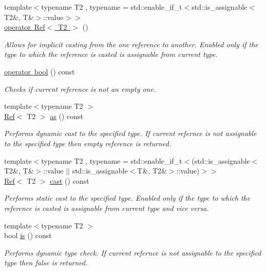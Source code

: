 \begin{DoxyCompactItemize}
{\footnotesize template$<$typename T2 , typename  = std\+::enable\+\_\+if\+\_\+t$<$std\+::is\+\_\+assignable$<$\+T2\&, T\&$>$\+::value$>$$>$ }\\\mbox{\hyperlink{class_ref_a092daaa0d297f615642fc4870cff4f47}{operator Ref$<$ T2 $>$}} ()
\begin{DoxyCompactList}\small\item\em Allows for implicit casting from the one reference to another. Enabled only if the type to which the reference is casted is assignable from current type. \end{DoxyCompactList}\item 
\mbox{\hyperlink{class_ref_a1feffacefd6a3f6e42a362e0669264ee}{operator bool}} () const
\begin{DoxyCompactList}\small\item\em Checks if current reference is not an empty one. \end{DoxyCompactList}\item 
{\footnotesize template$<$typename T2 $>$ }\\\mbox{\hyperlink{class_ref}{Ref}}$<$ T2 $>$ \mbox{\hyperlink{class_ref_a3debb396d13901075faf5bd1663ae9c6}{as}} () const
\begin{DoxyCompactList}\small\item\em Performs dynamic cast to the specified type. If current refernce is not assignable to the specified type then empty reference is returned. \end{DoxyCompactList}\item 
{\footnotesize template$<$typename T2 , typename  = std\+::enable\+\_\+if\+\_\+t$<$(std\+::is\+\_\+assignable$<$\+T2\&, T\&$>$\+::value $\vert$$\vert$ std\+::is\+\_\+assignable$<$\+T\&, T2\&$>$\+::value)$>$$>$ }\\\mbox{\hyperlink{class_ref}{Ref}}$<$ T2 $>$ \mbox{\hyperlink{class_ref_a616580cb90ccb7611dcc3b2c1d15130d}{cast}} () const
\begin{DoxyCompactList}\small\item\em Performs static cast to the specified type. Enabled only if the type to which the reference is casted is assignable from current type and vice versa. \end{DoxyCompactList}\item 
{\footnotesize template$<$typename T2 $>$ }\\bool \mbox{\hyperlink{class_ref_a1f1c08e3689380efc4471e109dafce28}{is}} () const
\begin{DoxyCompactList}\small\item\em Performs dynamic type check. If current refernce is not assignable to the specified type then false is returned. \end{DoxyCompactList}\item 

\end{DoxyCompactItemize}

